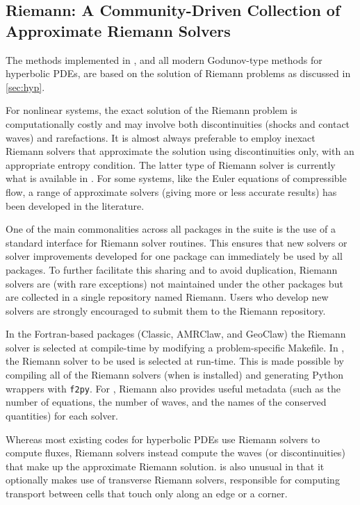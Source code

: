 %
%

\subsection{Riemann: A Community-Driven Collection of Approximate Riemann
Solvers}\label{sec:riemann}

The methods implemented in \clawpack, and all modern Godunov-type methods for
hyperbolic PDEs, are based on the solution of Riemann problems as discussed
in \cref{sec:hyp}.  

For nonlinear systems, the exact solution of the Riemann problem is
computationally costly and may involve both discontinuities (shocks and contact
waves) and rarefactions.  It is almost always preferable to employ inexact
Riemann solvers that approximate the solution using discontinuities only, with
an appropriate entropy condition.  The latter type of Riemann solver is
currently what is available in \clawpack.  For some systems, like the Euler
equations of compressible flow, a range of approximate solvers (giving more or
less accurate results) has been developed in the literature.

One of the main commonalities across all packages in the \clawpack suite is the
use of a standard interface for Riemann solver routines.  This ensures that new
solvers or solver improvements developed for one package can immediately
be used by all packages.  To further facilitate this sharing and to avoid 
duplication, Riemann solvers are (with rare exceptions) not maintained under
the other packages but are collected in a single repository named Riemann.
Users who develop new solvers are strongly encouraged to submit them to the
Riemann repository.

In the Fortran-based packages (Classic, AMRClaw, and GeoClaw) the Riemann solver
is selected at compile-time by modifying a problem-specific Makefile. In
\pyclaw, the Riemann solver to be used is selected at run-time.  This is made
possible by compiling all of the Riemann solvers (when \pyclaw is installed) and
generating Python wrappers with \texttt{f2py}.  For \pyclaw, Riemann also
provides useful metadata (such as the number of equations, the number of waves,
and the names of the conserved quantities) for each solver.

Whereas most existing codes for hyperbolic PDEs use Riemann solvers to
compute fluxes, \clawpack Riemann solvers instead compute the waves 
(or discontinuities) that make up the approximate Riemann solution.
\clawpack is also unusual in that it optionally makes use of transverse
Riemann solvers, responsible for computing transport between cells that
touch only along an edge or a corner.

